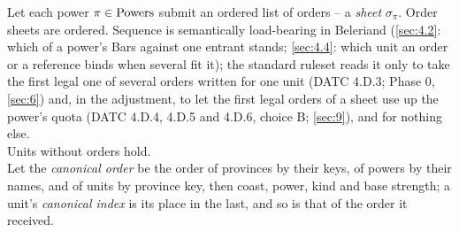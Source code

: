 \documentclass[12pt,a4paper]{article}
\begin{document}
Let each power $\pi \in \mathrm{Powers}$ submit an ordered list of orders -- a \emph{sheet} $\sigma_{\pi}$.
Order sheets are ordered.
Sequence is semantically load-bearing in Beleriand (\cref{sec:4.2}: which of a power's Bars against one entrant stands; \cref{sec:4.4}: which unit an order or a reference binds when several fit it); the standard ruleset reads it only to take the first legal one of several orders written for one unit (DATC 4.D.3; Phase 0, \cref{sec:6}) and, in the adjustment, to let the first legal orders of a sheet use up the power's quota (DATC 4.D.4, 4.D.5 and 4.D.6, choice B; \cref{sec:9}), and for nothing else.\\
Units without orders hold.\\
Let the \emph{canonical order} be the order of provinces by their keys, of powers by their names, and of units by province key, then coast, power, kind and base strength; a unit's \emph{canonical index} is its place in the last, and so is that of the order it received.
\end{document}
